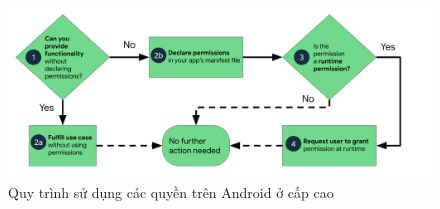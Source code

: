 \begin{flushleft}
        \begin{figure}[H] 
            \centering
            \includegraphics[width=1\textwidth]{images/permission.png}
            \caption{Quy trình sử dụng các quyền trên Android ở cấp cao}
            \label{fig:android}
        \end{figure}
    \end{flushleft} 
\newpage

